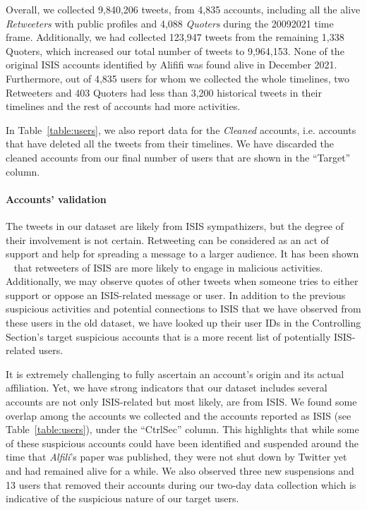 \documentclass[letterpaper]{article}
\begin{document}
Overall, we collected 9,840,206 tweets, from 4,835 accounts, including all the alive \textit{Retweeters} with public profiles and 4,088 \textit{Quoters} during the 20092021 time frame. Additionally, we had collected 123,947 tweets from the remaining 1,338 Quoters, which increased our total number of tweets to 9,964,153. None of the original ISIS accounts identified by Alififi \cite{alfifi2018measuring} was found alive in December 2021. Furthermore, out of 4,835 users for whom we collected the whole timelines, two Retweeters and 403 Quoters had less than 3,200 historical tweets in their timelines and the rest of accounts had more activities.

In Table~\ref{table:users}, we also report data for the {\em Cleaned}  accounts, i.e. accounts  that  have deleted all the tweets from their timelines.  We have discarded the cleaned accounts from our final number of users that are shown in the ``Target'' column.

\paragraph{Accounts' validation}

The tweets in our dataset are likely from ISIS sympathizers, but the degree of their involvement is not certain.
Retweeting can be considered as an act of support and help for spreading a message to a larger audience. It has been shown ~\cite{alfifi2018measuring} that retweeters of ISIS are more likely to engage in malicious activities. Additionally, we may observe quotes of other tweets when someone tries to either support or oppose an ISIS-related message or user. In addition to the previous suspicious activities and potential connections to ISIS that we have observed from these users in the old dataset, we have looked up their user IDs in the Controlling Section's target suspicious accounts that is a more recent list of potentially ISIS-related users.

It is extremely challenging to fully ascertain an account's origin and its actual affiliation.
Yet, we have strong indicators that our dataset includes several  accounts are not only ISIS-related but most likely, are from ISIS. We found some overlap among the accounts we collected and the accounts reported as ISIS (see Table~\ref{table:users}), under the ``CtrlSec'' column. This highlights that while some of these suspicious accounts could have been identified and suspended around the time that \textit{Alfili}'s paper was published, they were not shut down by Twitter yet and had remained alive for a while. We also observed three new suspensions and 13 users that removed their accounts during our two-day data collection which is indicative of  the suspicious nature of our target users.
\end{document}
